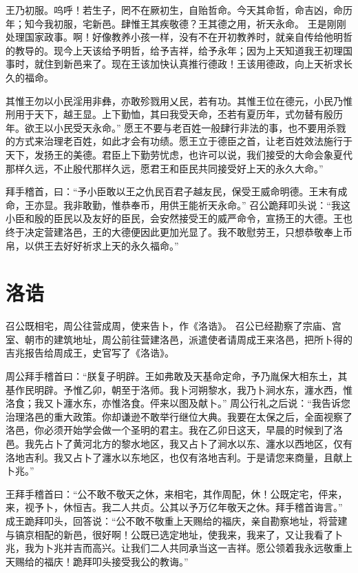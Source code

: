 \documentclass[a4paper,12pt,UTF8,twoside]{ctexbook}
\begin{document}
王乃初服。呜呼！若生子，罔不在厥初生，自贻哲命。今天其命哲，命吉凶，命历年；知今我初服，宅新邑。肆惟王其疾敬德？王其德之用，祈天永命。
王是刚刚处理国家政事。啊！好像教养小孩一样，没有不在开初教养时，就亲自传给他明哲的教导的。现今上天该给予明哲，给予吉祥，给予永年；因为上天知道我王初理国事时，就住到新邑来了。现在王该加快认真推行德政！王该用德政，向上天祈求长久的福命。

其惟王勿以小民淫用非彝，亦敢殄戮用乂民，若有功。其惟王位在德元，小民乃惟刑用于天下，越王显。上下勤恤，其曰我受天命，丕若有夏历年，式勿替有殷历年。欲王以小民受天永命。”
愿王不要与老百姓一般肆行非法的事，也不要用杀戮的方式来治理老百姓，如此才会有功绩。愿王立于德臣之首，让老百姓效法施行于天下，发扬王的美德。君臣上下勤劳忧虑，也许可以说，我们接受的大命会象夏代那样久远，不止殷代那样久远，愿君王和臣民共同接受好上天的永久大命。”

拜手稽首，曰：“予小臣敢以王之仇民百君子越友民，保受王威命明德。王末有成命，王亦显。我非敢勤，惟恭奉币，用供王能祈天永命。”
召公跪拜叩头说：“我这小臣和殷的臣民以及友好的臣民，会安然接受王的威严命令，宣扬王的大德。王也终于决定营建洛邑，王的大德便因此更加光显了。我不敢慰劳王，只想恭敬奉上币帛，以供王去好好祈求上天的永久福命。”

\chapter{洛诰}

召公既相宅，周公往营成周，使来告卜，作《洛诰》。
召公已经勘察了宗庙、宫室、朝市的建筑地址，周公前往营建洛邑，派遣使者请周成王来洛邑，把所卜得的吉兆报告给周成王，史官写了《洛诰》。

周公拜手稽首曰：“朕复子明辟。王如弗敢及天基命定命，予乃胤保大相东土，其基作民明辟。予惟乙卯，朝至于洛师。我卜河朔黎水，我乃卜涧水东，瀍水西，惟洛食；我又卜瀍水东，亦惟洛食。伻来以图及献卜。”
周公行礼之后说：“我告诉您治理洛邑的重大政策。你却谦逊不敢举行继位大典。我要在太保之后，全面视察了洛邑，你必须开始学会做一个圣明的君主。我在乙卯日这天，早晨的时候到了洛邑。我先占卜了黄河北方的黎水地区，我又占卜了涧水以东、瀍水以西地区，仅有洛地吉利。我又占卜了瀍水以东地区，也仅有洛地吉利。于是请您来商量，且献上卜兆。”

王拜手稽首曰：“公不敢不敬天之休，来相宅，其作周配，休！公既定宅，伻来，来，视予卜，休恒吉。我二人共贞。公其以予万亿年敬天之休。拜手稽首诲言。”
成王跪拜叩头，回答说：“公不敢不敬重上天赐给的福庆，亲自勘察地址，将营建与镐京相配的新邑，很好啊！公既已选定地址，使我来，我来了，又让我看了卜兆，我为卜兆并吉而高兴。让我们二人共同承当这一吉祥。愿公领着我永远敬重上天赐给的福庆！跪拜叩头接受我公的教诲。”
\end{document}
